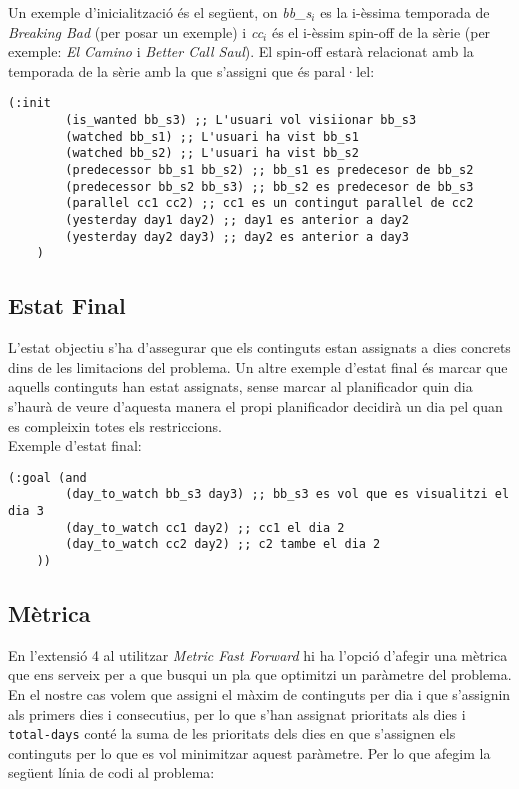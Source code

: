 \documentclass[a4paper]{article}
\begin{document}
	Un exemple d'inicialització és el següent, on \textit{bb\_s$_i$} es la i-èssima temporada de \textit{Breaking Bad} (per posar un exemple) i \textit{cc$_i$} és el i-èssim spin-off de la sèrie (per exemple: \textit{El Camino} i \textit{Better Call Saul}). El spin-off estarà relacionat amb la temporada de la sèrie amb la que s'assigni que és paral·lel:
	
	\begin{lstlisting}[language=PDDL, caption={Exemple d'inicialització del problema}, label={lst:ini_problema}]
	(:init
		(is_wanted bb_s3) ;; L'usuari vol visiionar bb_s3
		(watched bb_s1) ;; L'usuari ha vist bb_s1
		(watched bb_s2) ;; L'usuari ha vist bb_s2
		(predecessor bb_s1 bb_s2) ;; bb_s1 es predecesor de bb_s2
		(predecessor bb_s2 bb_s3) ;; bb_s2 es predecesor de bb_s3
		(parallel cc1 cc2) ;; cc1 es un contingut parallel de cc2
		(yesterday day1 day2) ;; day1 es anterior a day2
		(yesterday day2 day3) ;; day2 es anterior a day3
	)
	\end{lstlisting}
	
	\subsection{Estat Final}
	
	L'estat objectiu s’ha d’assegurar que els continguts estan assignats a dies concrets dins de les limitacions del problema. Un altre exemple d'estat final és marcar que aquells continguts han estat assignats, sense marcar al planificador quin dia s'haurà de veure d'aquesta manera el propi planificador decidirà un dia pel quan es compleixin totes els restriccions. \\
	
	Exemple d’estat final:
	
	\begin{lstlisting}[language=PDDL, caption={Exemple de \textit{goal} del problema}, label={lst:goal_problema}]
	(:goal (and
		(day_to_watch bb_s3 day3) ;; bb_s3 es vol que es visualitzi el dia 3
		(day_to_watch cc1 day2) ;; cc1 el dia 2
		(day_to_watch cc2 day2) ;; c2 tambe el dia 2
	))
	\end{lstlisting}
	
	\subsection{Mètrica}
	
	En l'extensió 4 al utilitzar \textit{Metric Fast Forward} hi ha l'opció d'afegir una mètrica que ens serveix per a que busqui un pla que optimitzi un paràmetre del problema. En el nostre cas volem que assigni el màxim de continguts per dia i que s'assignin als primers dies i consecutius, per lo que s'han assignat prioritats als dies i \texttt{total-days} conté la suma de les prioritats dels dies en que s'assignen els continguts per lo que es vol minimitzar aquest paràmetre. Per lo que afegim la següent línia de codi al problema:
	
\end{document}
